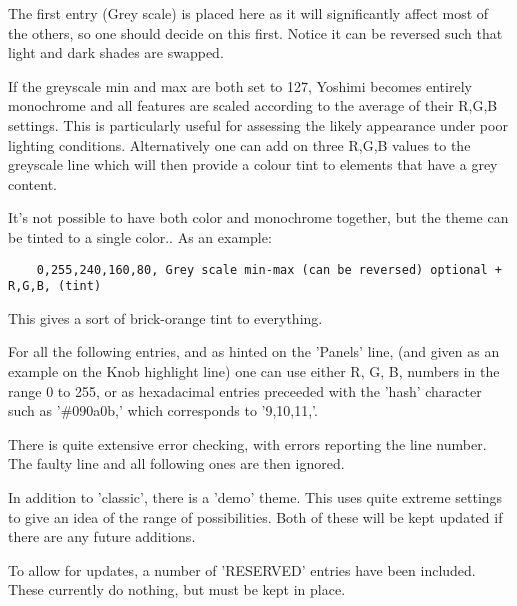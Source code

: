    The first entry (Grey scale) is placed here as it will significantly affect
   most of the others, so one should decide on this first. Notice it can be
   reversed such that light and dark shades are swapped.

   If the greyscale min and max are both set to 127, Yoshimi becomes entirely
   monochrome and all features are scaled according to the average of their
   R,G,B settings. This is particularly useful for assessing the likely
   appearance under poor lighting conditions. Alternatively one can add on
   three R,G,B values to the greyscale line which will then provide a colour
   tint to elements that have a grey content.

   It's not possible to have both color and monochrome together, but the theme
   can be tinted to a single color..
   As an example:

   \begin{verbatim}
    0,255,240,160,80, Grey scale min-max (can be reversed) optional + R,G,B, (tint)
   \end{verbatim}

   This gives a sort of brick-orange tint to everything.

   For all the following entries, and as hinted on the 'Panels' line, (and given
   as an example on the Knob highlight line) one can use either R, G, B, numbers
   in the range 0 to 255, or as hexadacimal entries preceeded with the 'hash'
   character such as '\#090a0b,' which corresponds to '9,10,11,'.

   There is quite extensive error checking, with errors reporting the line
   number. The faulty line and all following ones are then ignored.

   In addition to 'classic', there is a 'demo' theme. This uses quite extreme
   settings to give an idea of the range of possibilities. Both of these will be
   kept updated if there are any future additions.

   To allow for updates, a number of 'RESERVED' entries have been included. These
   currently do nothing, but must be kept in place.

